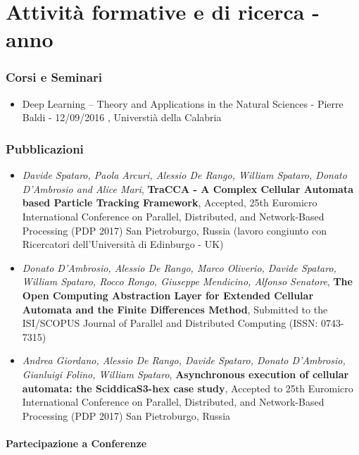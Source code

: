\part{Attività formative e di ricerca -   anno}
\section{Corsi e Seminari}
\begin{itemize}
	\item Deep Learning – Theory and Applications in the Natural Sciences - Pierre Baldi - 12/09/2016 , Universtià della Calabria
\end{itemize}


\section{Pubblicazioni}
\begin{itemize}
\item \textit{Davide Spataro, Paola Arcuri, Alessio De Rango, William Spataro, Donato
D’Ambrosio and Alice Mari}, \textbf{TraCCA - A Complex Cellular Automata
based Particle Tracking Framework}, Accepted, 25th Euromicro
International Conference on Parallel, Distributed, and Network-Based
Processing (PDP 2017) San Pietroburgo, Russia (lavoro congiunto con
Ricercatori dell’Università di Edinburgo - UK)

	\item \textit{Donato D’Ambrosio, Alessio De Rango, Marco Oliverio, Davide Spataro,
William Spataro, Rocco Rongo, Giuseppe Mendicino, Alfonso Senatore},
\textbf{The Open Computing Abstraction Layer for Extended Cellular
Automata and the Finite Differences Method}, Submitted to the
ISI/SCOPUS Journal of Parallel and Distributed Computing (ISSN: 0743-
7315)

\item \textit{Andrea Giordano, Alessio De Rango, Davide Spataro, Donato D’Ambrosio,
Gianluigi Folino, William Spataro}, \textbf{Asynchronous execution
of cellular automata: the SciddicaS3-hex case study}, Accepted to
25th Euromicro International Conference on Parallel, Distributed, and
Network-Based Processing (PDP 2017) San Pietroburgo, Russia

\end{itemize}	

\subsection{Partecipazione a  Conferenze}


